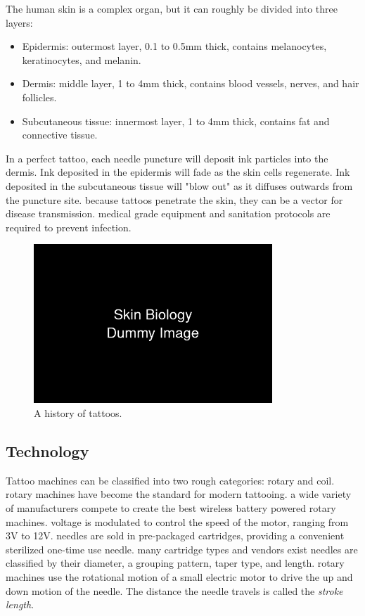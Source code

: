 \documentclass[11pt]{article}
\begin{document}
The human skin is a complex organ, but it can roughly be divided into three layers:

\begin{itemize}
    \item Epidermis: outermost layer, 0.1 to 0.5mm thick, contains melanocytes, keratinocytes, and melanin.
    \item Dermis: middle layer, 1 to 4mm thick, contains blood vessels, nerves, and hair follicles.
    \item Subcutaneous tissue: innermost layer, 1 to 4mm thick, contains fat and connective tissue.
\end{itemize}

In a perfect tattoo, each needle puncture will deposit ink particles into the dermis.
Ink deposited in the epidermis will fade as the skin cells regenerate.
Ink deposited in the subcutaneous tissue will "blow out" as it diffuses outwards from the puncture site.
because tattoos penetrate the skin, they can be a vector for disease transmission.
medical grade equipment and sanitation protocols are required to prevent infection.

\begin{figure}[h]
    \centering
    \includegraphics[width=0.8\textwidth]{figures/biology.png}
    \caption{A history of tattoos.}
    \label{fig:timeline}
\end{figure}

\pagebreak

\subsection{Technology}

Tattoo machines can be classified into two rough categories: rotary and coil.
rotary machines have become the standard for modern tattooing.
a wide variety of manufacturers compete to create the best wireless battery powered rotary machines.
voltage is modulated to control the speed of the motor, ranging from 3V to 12V.
needles are sold in pre-packaged cartridges, providing a convenient sterilized one-time use needle.
many cartridge types and vendors exist
needles are classified by their diameter, a grouping pattern, taper type, and length.
rotary machines use the rotational motion of a small electric motor to drive the up and down motion of the needle.
The distance the needle travels is called the \textit{stroke length}.
\end{document}
